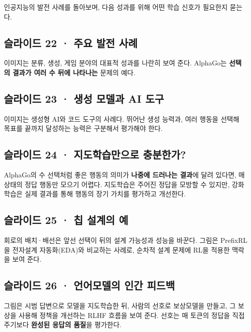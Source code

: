 \documentclass[11pt,a4paper]{article}
\begin{document}
인공지능의 발전 사례를 돌아보며, 다음 성과를 위해 어떤 학습 신호가 필요한지 묻는다.\par

\subsection{슬라이드 22 · 주요 발전 사례}

이미지는 분류, 생성, 게임 분야의 대표적 성과를 나란히 보여 준다. AlphaGo는 \textbf{선택의 결과가 여러 수 뒤에 나타나는} 문제의 예다.\par

\subsection{슬라이드 23 · 생성 모델과 AI 도구}

이미지는 생성형 AI와 코드 도구의 사례다. 뛰어난 생성 능력과, 여러 행동을 선택해 목표를 끝까지 달성하는 능력은 구분해서 평가해야 한다.\par

\subsection{슬라이드 24 · 지도학습만으로 충분한가?}

AlphaGo의 수 선택처럼 좋은 행동의 의미가 \textbf{나중에 드러나는 결과}에 달려 있다면, 매 상태의 정답 행동만 모으기 어렵다. 지도학습은 주어진 정답을 모방할 수 있지만, 강화학습은 실제 결과를 통해 행동의 장기 가치를 평가하고 개선한다.\par

\subsection{슬라이드 25 · 칩 설계의 예}

회로의 배치·배선은 앞선 선택이 뒤의 설계 가능성과 성능을 바꾼다. 그림은 PrefixRL을 전자설계 자동화(EDA)와 비교하는 사례로, 순차적 설계 문제에 RL을 적용한 맥락을 보여 준다.\par

\subsection{슬라이드 26 · 언어모델의 인간 피드백}

그림은 시범 답변으로 모델을 지도학습한 뒤, 사람의 선호로 보상모델을 만들고, 그 보상을 사용해 정책을 개선하는 RLHF 흐름을 보여 준다. 선호는 매 토큰의 정답을 직접 주기보다 \textbf{완성된 응답의 품질}을 평가한다.\par
\end{document}
